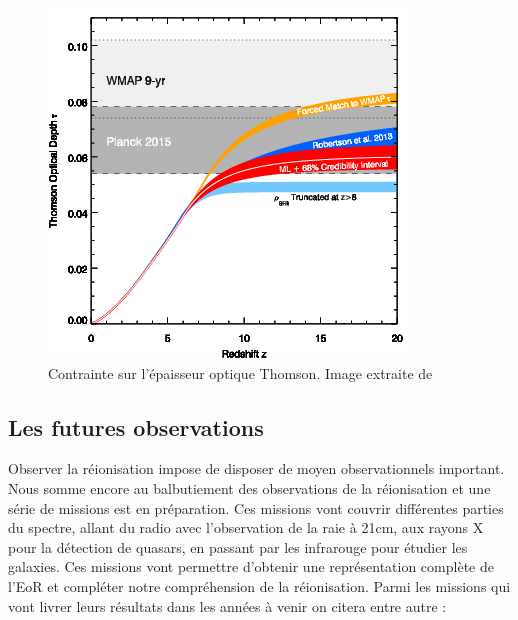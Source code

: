 \begin{figure}
        \includegraphics[width=.9\linewidth]{img/01/epaisseur_optique_thomson.png} 
        \caption[Epaisseur optique Thomson]{%
		Contrainte sur l'épaisseur optique Thomson.
        Image extraite de \cite{2015ApJ...802L..19R}
 		\label{fig:epaisseur_optique_thomson} }
\end{figure}



\subsection{Les futures observations}


Observer la réionisation impose de disposer de moyen observationnels important.
Nous somme encore au balbutiement des observations de la réionisation et une série de missions est en préparation.
Ces missions vont couvrir différentes parties du spectre, allant du radio avec l'observation de la raie à 21cm, aux rayons X pour la détection de quasars, en passant par les infrarouge pour étudier les galaxies.
Ces missions vont permettre d'obtenir une représentation complète de l'\ac{EoR} et compléter notre compréhension de la réionisation.
Parmi les missions qui vont livrer leurs résultats dans les années à venir on citera entre autre :

